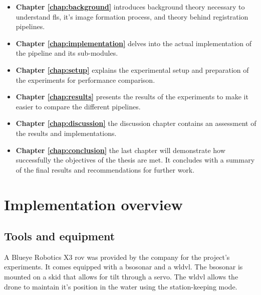 \begin{itemize}
    \item \textbf{Chapter \ref{chap:background}} introduces background theory necessary to understand \acrshort{fls}, it's image formation process, and theory behind registration pipelines.
    \item \textbf{Chapter \ref{chap:implementation}} delves into the actual implementation of the pipeline and its sub-modules.
    \item \textbf{Chapter \ref{chap:setup}} explains the experimental setup and preparation of the experiments for performance comparison.
    \item \textbf{Chapter \ref{chap:results}} presents the results of the experiments to make it easier to compare the different pipelines.
    \item \textbf{Chapter \ref{chap:discussion}} the discussion chapter contains an assessment of the results and implementations.
    \item \textbf{Chapter \ref{chap:conclusion}} the last chapter will demonstrate how successfully the objectives of the thesis are met. It concludes with a summary of the final results and recommendations for further work.
\end{itemize}

\section{Implementation overview}

\subsection{Tools and equipment}

A Blueye Robotics X3 \acrshort{rov} was provided by the company for the project's experiments. It comes equipped with a \acrfull{bsosonar} and a \acrfull{wldvl}. The \acrshort{bsosonar} is mounted on a skid that allows for tilt through a servo. The \acrshort{wldvl} allows the drone to maintain it's position in the water using the station-keeping mode.

